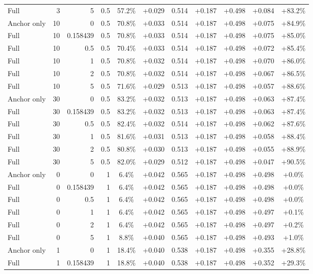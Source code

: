 \begin{table}[htbp]
\begin{tabular}{lrrrccccccc}
Full & 3 & 5 & 0.5 & 57.2\% & +0.029 & 0.514 & +0.187 & +0.498 & +0.084 & +83.2\% \\
Anchor only & 10 & 0 & 0.5 & 70.8\% & +0.033 & 0.514 & +0.187 & +0.498 & +0.075 & +84.9\% \\
Full & 10 & 0.158439 & 0.5 & 70.8\% & +0.033 & 0.514 & +0.187 & +0.498 & +0.075 & +85.0\% \\
Full & 10 & 0.5 & 0.5 & 70.4\% & +0.033 & 0.514 & +0.187 & +0.498 & +0.072 & +85.4\% \\
Full & 10 & 1 & 0.5 & 70.8\% & +0.032 & 0.514 & +0.187 & +0.498 & +0.070 & +86.0\% \\
Full & 10 & 2 & 0.5 & 70.8\% & +0.032 & 0.514 & +0.187 & +0.498 & +0.067 & +86.5\% \\
Full & 10 & 5 & 0.5 & 71.6\% & +0.029 & 0.513 & +0.187 & +0.498 & +0.057 & +88.6\% \\
Anchor only & 30 & 0 & 0.5 & 83.2\% & +0.032 & 0.513 & +0.187 & +0.498 & +0.063 & +87.4\% \\
Full & 30 & 0.158439 & 0.5 & 83.2\% & +0.032 & 0.513 & +0.187 & +0.498 & +0.063 & +87.4\% \\
Full & 30 & 0.5 & 0.5 & 82.4\% & +0.032 & 0.514 & +0.187 & +0.498 & +0.062 & +87.6\% \\
Full & 30 & 1 & 0.5 & 81.6\% & +0.031 & 0.513 & +0.187 & +0.498 & +0.058 & +88.4\% \\
Full & 30 & 2 & 0.5 & 80.8\% & +0.030 & 0.513 & +0.187 & +0.498 & +0.055 & +88.9\% \\
Full & 30 & 5 & 0.5 & 82.0\% & +0.029 & 0.512 & +0.187 & +0.498 & +0.047 & +90.5\% \\
Anchor only & 0 & 0 & 1 & 6.4\% & +0.042 & 0.565 & +0.187 & +0.498 & +0.498 & +0.0\% \\
Full & 0 & 0.158439 & 1 & 6.4\% & +0.042 & 0.565 & +0.187 & +0.498 & +0.498 & +0.0\% \\
Full & 0 & 0.5 & 1 & 6.4\% & +0.042 & 0.565 & +0.187 & +0.498 & +0.498 & +0.0\% \\
Full & 0 & 1 & 1 & 6.4\% & +0.042 & 0.565 & +0.187 & +0.498 & +0.497 & +0.1\% \\
Full & 0 & 2 & 1 & 6.4\% & +0.042 & 0.565 & +0.187 & +0.498 & +0.497 & +0.2\% \\
Full & 0 & 5 & 1 & 8.8\% & +0.040 & 0.565 & +0.187 & +0.498 & +0.493 & +1.0\% \\
Anchor only & 1 & 0 & 1 & 18.4\% & +0.040 & 0.538 & +0.187 & +0.498 & +0.355 & +28.8\% \\
Full & 1 & 0.158439 & 1 & 18.8\% & +0.040 & 0.538 & +0.187 & +0.498 & +0.352 & +29.3\% \\

\end{tabular}
\end{table}
